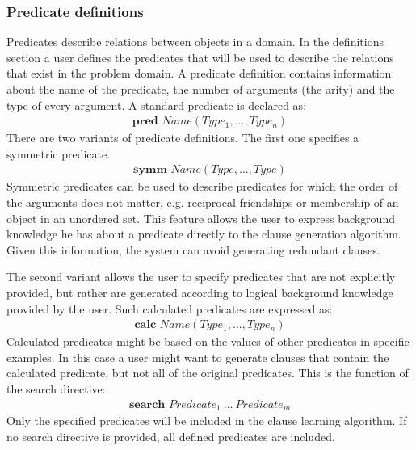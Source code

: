 \subsubsection{Predicate definitions}
Predicates describe relations between objects in a domain.
In the definitions section a user defines the predicates that will be used to describe the relations that exist in the problem domain.
A predicate definition contains information about the name of the predicate, the number of arguments (the arity) and the type of every argument.
A standard predicate is declared as:
\begin{align*}
\textbf{pred } Name(Type_1, ..., Type_n)
\end{align*}
There are two variants of predicate definitions.
The first one specifies a symmetric predicate.
\begin{align*}
\textbf{symm } Name(Type, ..., Type)
\end{align*}
Symmetric predicates can be used to describe predicates for which the order of the arguments does not matter, e.g. reciprocal friendships or membership of an object in an unordered set.
This feature allows the user to express background knowledge he has about a predicate directly to the clause generation algorithm.
Given this information, the system can avoid generating redundant clauses.

The second variant allows the user to specify predicates that are not explicitly provided, but rather are generated according to logical background knowledge provided by the user.
Such calculated predicates are expressed as:
\begin{align*}
\textbf{calc } Name(Type_1, ..., Type_n)
\end{align*}
Calculated predicates might be based on the values of other predicates in specific examples.
In this case a user might want to generate clauses that contain the calculated predicate, but not all of the original predicates.
This is the function of the search directive: 
\begin{align*}
\textbf{search } Predicate_1\  ...\  Predicate_m
\end{align*}
Only the specified predicates will be included in the clause learning algorithm.
If no search directive is provided, all defined predicates are included.

